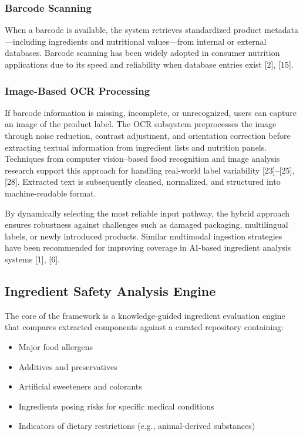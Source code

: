 \documentclass[conference]{IEEEtran}
\begin{document}
\subsubsection{Barcode Scanning}
When a barcode is available, the system retrieves standardized product metadata—including ingredients and nutritional values—from internal or external databases. Barcode scanning has been widely adopted in consumer nutrition applications due to its speed and reliability when database entries exist [2], [15].

\subsubsection{Image-Based OCR Processing}
If barcode information is missing, incomplete, or unrecognized, users can capture an image of the product label. The OCR subsystem preprocesses the image through noise reduction, contrast adjustment, and orientation correction before extracting textual information from ingredient lists and nutrition panels. Techniques from computer vision–based food recognition and image analysis research support this approach for handling real-world label variability [23]–[25], [28]. Extracted text is subsequently cleaned, normalized, and structured into machine-readable format.

By dynamically selecting the most reliable input pathway, the hybrid approach ensures robustness against challenges such as damaged packaging, multilingual labels, or newly introduced products. Similar multimodal ingestion strategies have been recommended for improving coverage in AI-based ingredient analysis systems [1], [6].

\subsection{Ingredient Safety Analysis Engine}

The core of the framework is a knowledge-guided ingredient evaluation engine that compares extracted components against a curated repository containing:

\begin{itemize}
    \item Major food allergens
    \item Additives and preservatives
    \item Artificial sweeteners and colorants
    \item Ingredients posing risks for specific medical conditions
    \item Indicators of dietary restrictions (e.g., animal-derived substances)
\end{itemize}
\end{document}
